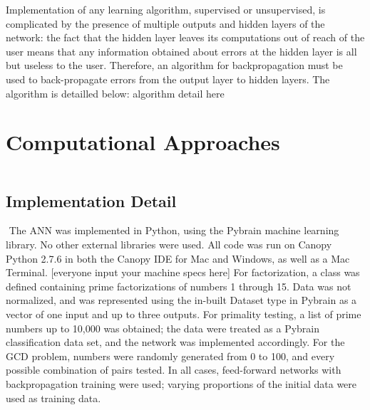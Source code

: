 \documentclass[11pt]{article}
\begin{document}
\indent Implementation of any learning algorithm, supervised or unsupervised, is complicated by the presence of multiple outputs and hidden layers of the network: the fact that the hidden layer leaves its computations out of reach of the user means that any information obtained about errors at the hidden layer is all but useless to the user. Therefore, an algorithm for backpropagation must be used to back-propagate errors from the output layer to hidden layers. The algorithm is detailled below: 
\indent algorithm detail here
\indent 


\section{Computational Approaches}$ $
\subsection{Implementation Detail}$ $
\indent The ANN was implemented in Python, using the Pybrain machine learning library. No other external libraries were used. All code was run on Canopy Python 2.7.6 in both the Canopy IDE for Mac and Windows, as well as a Mac Terminal. [everyone input your machine specs here]
\indent
For factorization, a class was defined containing prime factorizations of numbers 1 through 15. Data was not normalized, and was represented using the in-built Dataset type in Pybrain as a vector of one input and up to three outputs. For primality testing, a list of prime numbers up to 10,000 was obtained; the data were treated as a Pybrain classification data set, and the network was implemented accordingly. For the GCD problem, numbers were randomly generated from 0 to 100, and every possible combination of pairs tested. In all cases, feed-forward networks with backpropagation training were used; varying proportions of the initial data were used as training data.
\end{document}

